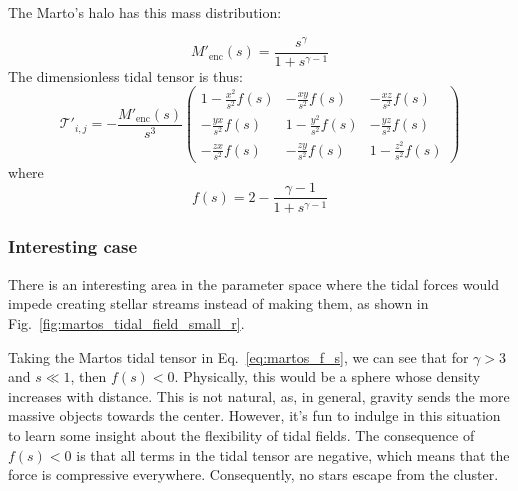             The Marto's halo has this mass distribution:
            
            \begin{equation}
                M'_\text{enc}(s) = \frac{s^\gamma}{1+s^{\gamma-1}}
            \end{equation}
            The dimensionless tidal tensor is thus: 
            \begin{equation}
                \mathcal{T'}_{i,j}= -\frac{M'_\text{enc}(s)}{s^3}\left(\begin{matrix}
                    1-\frac{x^2}{s^2}f(s) & -\frac{xy}{s^2}f(s) & -\frac{xz}{s^2}f(s) \\
                    -\frac{yx}{s^2}f(s) & 1-\frac{y^2}{s^2}f(s) & -\frac{yz}{s^2}f(s) \\
                    -\frac{zx}{s^2}f(s) & -\frac{zy}{s^2}f(s) & 1-\frac{z^2}{s^2}f(s)
                \end{matrix}\right)
            \end{equation}  
            where 
            \begin{equation}\label{eq:martos_f_s}
                f(s) = 2-\frac{\gamma-1}{1+s^{\gamma-1}}
            \end{equation}

        \subsubsection*{Interesting case}
            There is an interesting area in the parameter space where the tidal forces would impede creating stellar streams instead of making them, as shown in Fig.~\ref{fig:martos_tidal_field_small_r}.

            Taking the Martos tidal tensor in Eq.~\ref{eq:martos_f_s}, we can see that for $\gamma > 3$ and $s \ll  1$, then $f(s)< 0$. Physically, this would be a sphere whose density increases with distance. This is not natural, as, in general, gravity sends the more massive objects towards the center. However, it's fun to indulge in this situation to learn some insight about the flexibility of tidal fields. The consequence of $f(s)< 0$ is that all terms in the tidal tensor are negative, which means that the force is compressive everywhere. Consequently, no stars escape from the cluster. 

